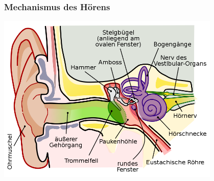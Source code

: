 \documentclass{beamer}
\begin{document}
\begin{frame}
\frametitle{Mechanismus des Hörens}


\begin{center}
\includegraphics[width=0.8\textwidth]{Anatomy_of_the_Human_Ear.png}
\end{center}



\end{frame}
\end{document}
